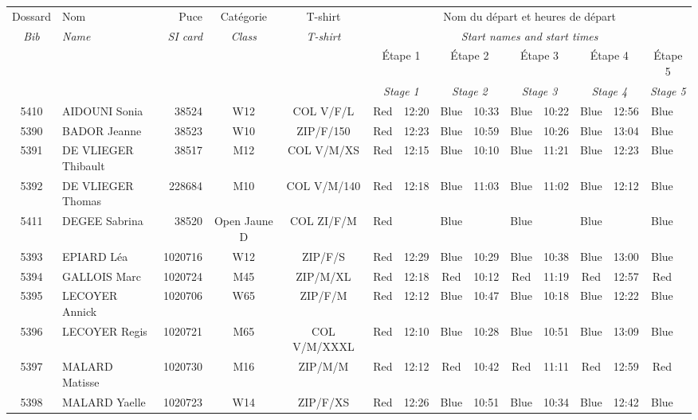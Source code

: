 \documentclass{report}
\begin{document}
  \begin{longtable}{|c|l|r|c|c|*{5}{cc|}}
    Dossard & Nom  & Puce    & Catégorie & T-shirt & \multicolumn{10}{c|}{Nom du départ et heures de départ} \\
    \itshape Bib     & \itshape Name & \itshape SI card & \itshape Class  & \itshape  T-shirt  & \multicolumn{10}{c|}{\itshape Start names and start times} \\
    \hline
    & & & & & \multicolumn{2}{c|}{Étape 1} & \multicolumn{2}{c|}{Étape 2} & \multicolumn{2}{c|}{Étape 3} & \multicolumn{2}{c|}{Étape 4} & \multicolumn{2}{c|}{Étape 5} \\
    & & & & & \multicolumn{2}{c|}{\itshape Stage 1} & \multicolumn{2}{c|}{\itshape Stage 2} & \multicolumn{2}{c|}{\itshape Stage 3} & \multicolumn{2}{c|}{\itshape Stage 4} & \multicolumn{2}{c|}{\itshape Stage 5} \\
    \hline
    5410 & AIDOUNI Sonia & 38524 & W12 & COL V/F/L & Red & 12:20 & Blue & 10:33 & Blue & 10:22 & Blue & 12:56 & Blue &  \\
    5390 & BADOR Jeanne & 38523 & W10 & ZIP/F/150 & Red & 12:23 & Blue & 10:59 & Blue & 10:26 & Blue & 13:04 & Blue &  \\
    5391 & DE VLIEGER Thibault & 38517 & M12 & COL V/M/XS & Red & 12:15 & Blue & 10:10 & Blue & 11:21 & Blue & 12:23 & Blue &  \\
    5392 & DE VLIEGER Thomas & 228684 & M10 & COL V/M/140 & Red & 12:18 & Blue & 11:03 & Blue & 11:02 & Blue & 12:12 & Blue &  \\
    5411 & DEGEE Sabrina & 38520 & Open Jaune D & COL ZI/F/M & Red &   & Blue &   & Blue &   & Blue &   & Blue &  \\
    5393 & EPIARD Léa & 1020716 & W12 & ZIP/F/S & Red & 12:29 & Blue & 10:29 & Blue & 10:38 & Blue & 13:00 & Blue &  \\
    5394 & GALLOIS Marc & 1020724 & M45 & ZIP/M/XL & Red & 12:18 & Red & 10:12 & Red & 11:19 & Red & 12:57 & Red &  \\
    5395 & LECOYER Annick & 1020706 & W65 & ZIP/F/M & Red & 12:12 & Blue & 10:47 & Blue & 10:18 & Blue & 12:22 & Blue &  \\
    5396 & LECOYER Regis & 1020721 & M65 & COL V/M/XXXL & Red & 12:10 & Blue & 10:28 & Blue & 10:51 & Blue & 13:09 & Blue &  \\
    5397 & MALARD Matisse & 1020730 & M16 & ZIP/M/M & Red & 12:12 & Red & 10:42 & Red & 11:11 & Red & 12:59 & Red &  \\
    5398 & MALARD Yaelle & 1020723 & W14 & ZIP/F/XS & Red & 12:26 & Blue & 10:51 & Blue & 10:34 & Blue & 12:42 & Blue &  \\

\end{longtable}
\end{document}
